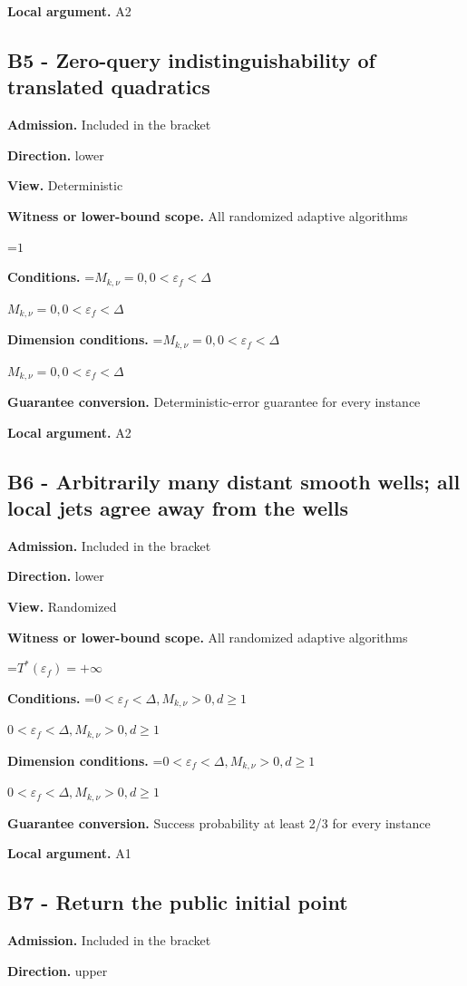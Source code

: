 \documentclass[10pt,a4paper]{article}
\newcommand{\AtlasMath}[1]{\par\begingroup\centering\setbox0=\hbox{$\displaystyle #1$}\ifdim\wd0>1.4\linewidth\typeout{ATLAS WIDE FORMULA: \the\wd0}\fi\ifdim\wd0>\linewidth\resizebox{\linewidth}{!}{\box0}\else\box0\fi\par\endgroup}
\newcommand{\AtlasInlineMath}[1]{\begingroup\setbox0=\hbox{$#1$}\ifdim\wd0>.4\linewidth\endgroup\AtlasMath{#1}\else\endgroup$#1$\fi}
\begin{document}
\textbf{Local argument.} A2

\subsection{B5 - Zero-query indistinguishability of translated quadratics}
\textbf{Admission.} Included in the bracket

\textbf{Direction.} lower

\textbf{View.} Deterministic

\textbf{Witness or lower-bound scope.} All randomized adaptive algorithms

\AtlasMath{1}
\textbf{Conditions.} \AtlasInlineMath{M_{k,\nu}=0,0<\varepsilon_f<\Delta}

\textbf{Dimension conditions.} \AtlasInlineMath{M_{k,\nu}=0,0<\varepsilon_f<\Delta}

\textbf{Guarantee conversion.} Deterministic-error guarantee for every instance

\textbf{Local argument.} A2

\subsection{B6 - Arbitrarily many distant smooth wells; all local jets agree away from the wells}
\textbf{Admission.} Included in the bracket

\textbf{Direction.} lower

\textbf{View.} Randomized

\textbf{Witness or lower-bound scope.} All randomized adaptive algorithms

\AtlasMath{T^*(\varepsilon_f)=+\infty}
\textbf{Conditions.} \AtlasInlineMath{0<\varepsilon_f<\Delta,M_{k,\nu}>0,d\ge 1}

\textbf{Dimension conditions.} \AtlasInlineMath{0<\varepsilon_f<\Delta,M_{k,\nu}>0,d\ge 1}

\textbf{Guarantee conversion.} Success probability at least 2/3 for every instance

\textbf{Local argument.} A1

\subsection{B7 - Return the public initial point}
\textbf{Admission.} Included in the bracket

\textbf{Direction.} upper
\end{document}

